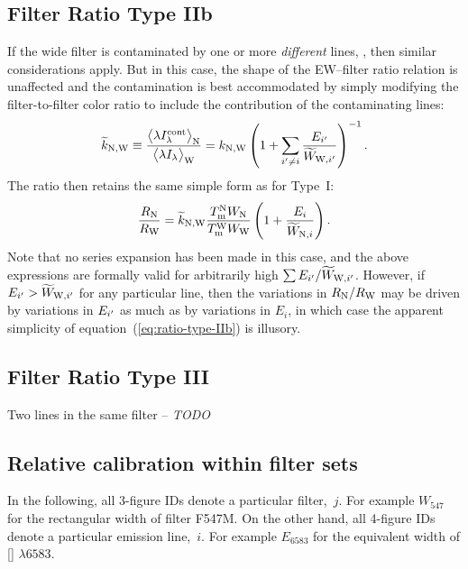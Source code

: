 \documentclass[preprint, 10pt]{aastex}
\newcommand\nii{[\ion{N}{2}]}
\newcommand\Wav[1]{\ensuremath{\lambda #1}}
\begin{document}
\subsection{Filter Ratio Type IIb}
\label{sec:typeIIb}
If the wide filter is contaminated by one or more \emph{different} lines,
\Contam{}, then similar considerations apply.
But in this case, the shape of the
EW--filter ratio relation is unaffected and the contamination is best
accommodated by simply modifying the filter-to-filter color ratio to
include the contribution of the contaminating lines:
\begin{equation}
  \label{eq:color-correct-IIb}
  \widetilde{k}_{\mathrm{N}, \mathrm{W}} \equiv \frac{\bigl\langle \lambda I_\lambda^{\mathrm{cont}} \bigr\rangle_{\mathrm{N}}}{\bigl\langle \lambda I_\lambda \bigr\rangle_{\mathrm{W}}}
  = k_{\mathrm{N}, \mathrm{W}} 
  \left( 1 + \sum_{{i'} \ne i}\frac{E_{{i'}}}{\widetilde{W}_{\mathrm{W}, {i'}}} \right)^{-1}
  .
\end{equation}
The ratio then retains the same simple form as for Type~I: 
\begin{equation}
  \label{eq:ratio-type-IIb}
  \frac{R_{\mathrm{N}}}{R_{\mathrm{W}}} = 
  \widetilde{k}_{\mathrm{N}, \mathrm{W}} \frac{T_{\mathrm{m}}^{\mathrm{N}} W_{\mathrm{N}}}{T_{\mathrm{m}}^{\mathrm{W}} W_{\mathrm{W}}}
  \left(
    1 + \frac{E_i}{\widetilde{W}_{\mathrm{N}, i}}
  \right) .
\end{equation}
Note that no series expansion has been made in this case, and the
above expressions are formally valid for arbitrarily high \(\sum E_{{i'}}
/ \widetilde{W}_{\mathrm{W}, {i'}}\).  However, if \(E_{{i'}} >
\widetilde{W}_{\mathrm{W}, {i'}}\) for any particular line, 
then the variations in \(R_{\mathrm{N}} / R_{\mathrm{W}}\)
may be driven by variations in \(E_{{i'}}\) as much as by variations
in \(E_i\), in which case the apparent simplicity of
equation~(\ref{eq:ratio-type-IIb}) is illusory. 

\subsection{Filter Ratio Type III}
\label{sec:typeIII}

Two lines in the same filter -- \textit{TODO}

\subsection{Relative calibration within filter sets}
\label{sec:application}

In the following, all 3-figure IDs denote a particular filter,~\(j\). 
For example \(W_{547}\) for the rectangular width of filter
F547M.  
On the other hand, all 4-figure IDs denote a particular emission line,~\(i\). 
For example \(E_{6583}\) for the equivalent width of \nii{}
\Wav{6583}.
\end{document}
